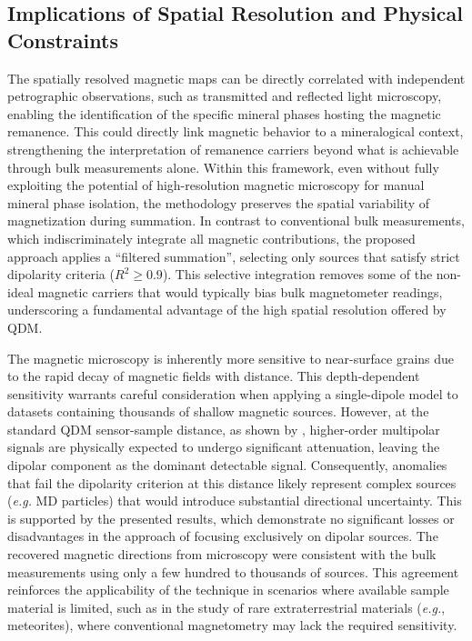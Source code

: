 \subsection{Implications of Spatial Resolution and Physical Constraints}

The spatially resolved magnetic maps can be directly correlated with independent petrographic observations, such as transmitted and reflected light microscopy, enabling the identification of the specific mineral phases hosting the magnetic remanence. This could directly link magnetic behavior to a mineralogical context, strengthening the interpretation of remanence carriers beyond what is achievable through bulk measurements alone. Within this framework, even without fully exploiting the potential of high-resolution magnetic microscopy for manual mineral phase isolation, the methodology preserves the spatial variability of magnetization during summation. In contrast to conventional bulk measurements, which indiscriminately integrate all magnetic contributions, the proposed approach applies a ``filtered summation'', selecting only sources that satisfy strict dipolarity criteria ($R^2 \geq 0.9$). This selective integration removes some of the non-ideal magnetic carriers that would typically bias bulk magnetometer readings, underscoring a fundamental advantage of the high spatial resolution offered by QDM.

The magnetic microscopy is inherently more sensitive to near-surface grains due to the rapid decay of magnetic fields with distance. This depth-dependent sensitivity warrants careful consideration when applying a single-dipole model to datasets containing thousands of shallow magnetic sources. However, at the standard QDM sensor-sample distance, as shown by \citet{Bellon2025b}, higher-order multipolar signals are physically expected to undergo significant attenuation, leaving the dipolar component as the dominant detectable signal. Consequently, anomalies that fail the dipolarity criterion at this distance likely represent complex sources (\textit{e.g.} MD particles) that would introduce substantial directional uncertainty. This is supported by the presented results, which demonstrate no significant losses or disadvantages in the approach of focusing exclusively on dipolar sources. The recovered magnetic directions from microscopy were consistent with the bulk measurements using only a few hundred to thousands of sources. This agreement reinforces the applicability of the technique in scenarios where available sample material is limited, such as in the study of rare extraterrestrial materials (\textit{e.g.}, meteorites), where conventional magnetometry may lack the required sensitivity.

